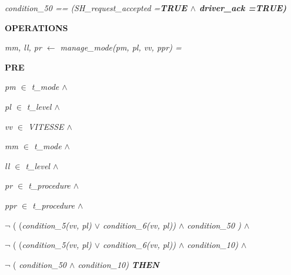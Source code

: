 {\begin{minipage}{14cm}
\hspace*{0.20in}\it condition\_50 \rm == \rm (\it SH\_request\_accepted \rm =\hspace*{0.10in}\bf TRUE  $\land$  \it driver\_ack \rm =\hspace*{0.10in}\bf TRUE\rm )


\bf OPERATIONS

\hspace*{0.20in}\it mm\rm , \it ll\rm , \it pr  $\leftarrow$  \it manage\_mode\rm (\it pm\rm , \it pl\rm , \it vv\rm , \it ppr\rm ) \rm =

\hspace*{0.20in}\bf PRE

\hspace*{0.40in}\it pm  $\in$ \hspace*{0.10in}\it t\_mode  $\land$ 

\hspace*{0.40in}\it pl  $\in$ \hspace*{0.10in}\it t\_level  $\land$ 

\hspace*{0.40in}\it vv  $\in$ \hspace*{0.10in}\it VITESSE  $\land$ 

\hspace*{0.40in}\it mm  $\in$  \it t\_mode  $\land$ 

\hspace*{0.40in}\it ll  $\in$  \it t\_level  $\land$ 

\hspace*{0.40in}\it pr  $\in$  \it t\_procedure  $\land$ 

\hspace*{0.40in}\it ppr  $\in$  \it t\_procedure  $\land$ 

\hspace*{0.40in} $\neg$  \rm ( \rm (\it condition\_5\rm (\it vv\rm , \it pl\rm )  $\lor$  \it condition\_6\rm (\it vv\rm , \it pl\rm )\rm )  $\land$  \it condition\_50 \rm )  $\land$ 

\hspace*{0.40in} $\neg$ \rm ( \rm (\it condition\_5\rm (\it vv\rm , \it pl\rm )  $\lor$  \it condition\_6\rm (\it vv\rm , \it pl\rm )\rm )  $\land$  \it condition\_10\hspace*{0.10in}\rm )  $\land$ 

\hspace*{0.40in} $\neg$ \rm ( \it condition\_50  $\land$  \it condition\_10\hspace*{0.10in}\rm )
\hspace*{0.20in}\bf THEN


\end{minipage}}
